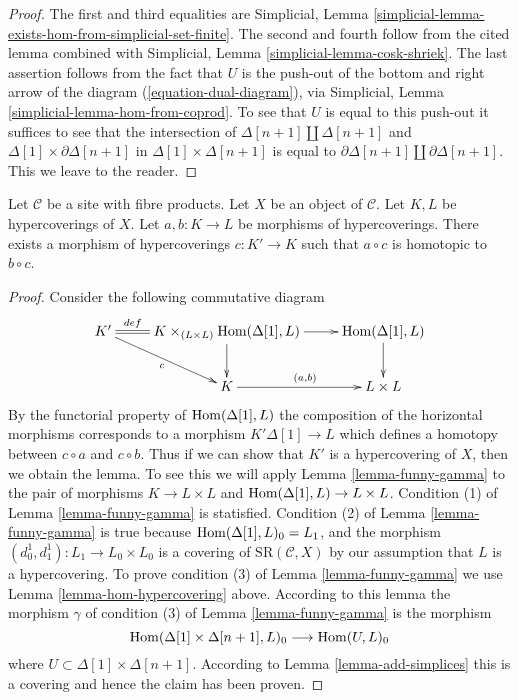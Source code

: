 \begin{proof}
The first and third equalities are
Simplicial, Lemma \ref{simplicial-lemma-exists-hom-from-simplicial-set-finite}.
The second and fourth follow from the cited lemma combined with
Simplicial, Lemma \ref{simplicial-lemma-cosk-shriek}.
The last assertion follows from the fact that
$U$ is the push-out of the bottom and right arrow of the
diagram (\ref{equation-dual-diagram}), via
Simplicial, Lemma \ref{simplicial-lemma-hom-from-coprod}.
To see that $U$ is equal to this push-out it suffices
to see that the intersection of
$\Delta[n + 1] \amalg \Delta[n + 1]$ and
$\Delta[1] \times \partial\Delta[n + 1]$
in $\Delta[1] \times \Delta[n + 1]$ is equal to
$\partial\Delta[n + 1] \amalg \partial\Delta[n + 1]$.
This we leave to the reader.
\end{proof}

\begin{lemma}
\label{lemma-homotopy}
Let $\mathcal{C}$ be a site with fibre products.
Let $X$ be an object of $\mathcal{C}$.
Let $K, L$ be hypercoverings of $X$.
Let $a, b : K \to L$ be morphisms of hypercoverings.
There exists a morphism of hypercoverings
$c : K' \to K$ such that $a \circ c$ is homotopic
to $b \circ c$.
\end{lemma}

\begin{proof}
Consider the following commutative diagram
$$
\xymatrix{
K' \ar@{=}[r]^-{def} \ar[rd]_c &
K \times_{(L \times L)} \Hom(\Delta[1], L)
\ar[r] \ar[d] & \Hom(\Delta[1], L) \ar[d] \\
& K \ar[r]^{(a, b)} & L \times L
}
$$
By the functorial property of $\mathop{\rm Hom}\nolimits(\Delta[1], L)$
the composition of the horizontal morphisms
corresponds to a morphism $K' \Delta[1] \to L$ which
defines a homotopy between $c \circ a$ and $c \circ b$.
Thus if we can show that $K'$ is a
hypercovering of $X$, then we obtain the lemma.
To see this we will apply Lemma \ref{lemma-funny-gamma}
to the pair of morphisms $K \to L \times L$
and $\mathop{\rm Hom}\nolimits(\Delta[1], L) \to L \times L$.
Condition (1) of Lemma \ref{lemma-funny-gamma} is statisfied.
Condition (2) of Lemma \ref{lemma-funny-gamma} is true because
$\mathop{\rm Hom}\nolimits(\Delta[1], L)_0 = L_1$, and the morphism
$(d^1_0, d^1_1) : L_1 \to L_0 \times L_0$ is a
covering of $\text{SR}(\mathcal{C}, X)$ by our
assumption that $L$ is a hypercovering.
To prove condition (3) of Lemma \ref{lemma-funny-gamma}
we use Lemma \ref{lemma-hom-hypercovering} above. According
to this lemma the morphism $\gamma$ of condition (3) of Lemma
\ref{lemma-funny-gamma} is the morphism
$$
\mathop{\rm Hom}\nolimits(\Delta[1] \times \Delta[n + 1], L)_0
\longrightarrow
\mathop{\rm Hom}\nolimits(U, L)_0
$$
where $U \subset \Delta[1] \times \Delta[n + 1]$.
According to Lemma \ref{lemma-add-simplices}
this is a covering and hence the claim has been proven.
\end{proof}

